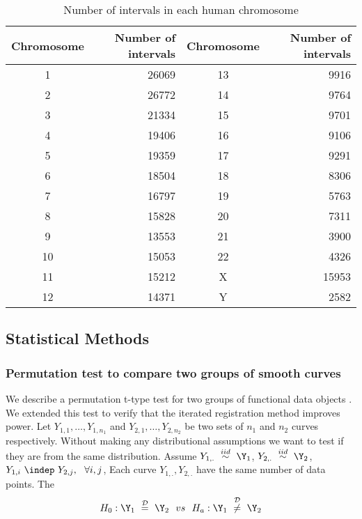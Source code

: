 \begin{table}[H]
\small
\centering
\begin{tabular}{c | r || c | r}
  \hline
  \hline
  Chromosome & Number of intervals & Chromosome & Number of intervals \\ 
  \hline
  \hline
   1 & 26069  & 13 & 9916 \\
   2 & 26772  & 14 & 9764 \\
   3 & 21334  & 15 & 9701 \\
   4 & 19406  & 16 & 9106 \\
   5 & 19359  & 17 & 9291 \\
   6 & 18504  & 18 & 8306 \\
   7 & 16797  & 19 & 5763 \\
   8 & 15828  & 20 & 7311 \\
   9 & 13553  & 21 & 3900 \\
  10 & 15053  & 22 & 4326 \\
  11 & 15212  &  X & 15953 \\
  12 & 14371  &  Y & 2582 \\
  \hline
  \hline
\end{tabular}
\caption{Number of intervals in each human chromosome}
\label{tab:Sec7_mm52table}
\end{table}

\subsection{Statistical Methods} \label{Sec7_Stat}
\subsubsection{Permutation test to compare two groups of smooth curves} \label{Sec7_FTTest}
We describe a permutation t-type test for two groups of functional data objects \cite{Ramsay_etal_2009_Functional_R}. We extended this test to verify that the iterated registration method improves power. Let $Y_{1,1}, \dots, Y_{1,n_1}$ and $Y_{2,1}, \dots, Y_{2,n_2}$ be two sets of $n_1$ and $n_2$ curves respectively. Without making any distributional assumptions we want to test if they are from the same distribution. Assume $Y_{1,.}\  \stackrel{iid}{\sim} \ \Y_1$, $Y_{2,.}\  \stackrel{iid}{\sim} \ \Y_2$, $Y_{1,i}\  \indep \ Y_{2,j}, \ \ \forall i, j$, Each curve $Y_{1,.}, Y_{2,.}$ have the same number of data points. The 
\[ H_0: \Y_1 \ \stackrel{\mathcal{D}}{=} \ \Y_2 \ \ vs \ \ H_a: \Y_1 \ \stackrel{\mathcal{D}}{\ne} \ \Y_2 \]

